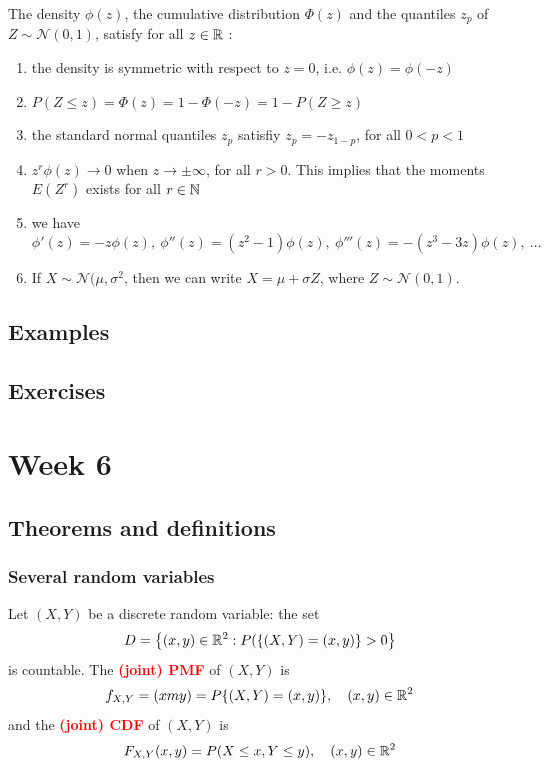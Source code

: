 \documentclass[12pt,a4paper]{article}
\begin{document}
 The density $\phi(z)$, the cumulative distribution $\Phi(z)$ and the quantiles $z_p$ of $Z \sim \mathcal{N}(0,1)$, satisfy for all $z \in \mathbb{R}$ :
\begin{enumerate}[label = (\alph*)]
    \item the density is symmetric with respect to $z = 0$, i.e. $\phi(z) = \phi(-z)$
    \item $P(Z \leq z) = \Phi(z) = 1-\Phi(-z) = 1-P(Z \geq z)$
    \item the standard normal quantiles $z_p$ satisfiy $z_p = -z_{1-p}$, for all $0 < p< 1$
    \item $z^r\phi(z) \to 0$ when $z \to \pm \infty$, for all $r > 0$. This implies that the moments $E(Z^r)$ exists for all $r \in \mathbb{N}$
    \item we have 
            \[\phi'(z) = -z\phi(z),\ \phi''(z) = (z^2 -1)\phi(z),\ \phi'''(z) = -(z^3-3z)\phi(z),\ \ldots\]
    \item If $X \sim \mathcal{N}(\mu, \sigma^2$, then we can write $X = \mu + \sigma Z$, where $Z \sim \mathcal{N}(0,1)$.
\end{enumerate}
\subsection{Examples}
\subsection{Exercises}
\section{Week 6}
\subsection{Theorems and definitions}
\subsubsection*{Several random variables}
 Let $(X,Y)$ be a discrete random variable: the set 
\[D = \big\{(x,y) \in \mathbb{R}^2 : P(\{(X,Y) = (x,y)\} > 0\big\}\]
is countable. The \textbf{\textcolor{red}{(joint) PMF}} of $(X,Y)$ is 
\[f_{X,Y} = (xmy) = P\{(X,Y) = (x,y)\},\quad (x,y) \in \mathbb{R}^2\]
and the \textbf{\textcolor{red}{(joint) CDF}} of $(X,Y)$ is 
\[F_{X,Y} (x,y) = P(X \leq x, Y \leq y),\quad (x,y) \in \mathbb{R}^2\]
\end{document}
